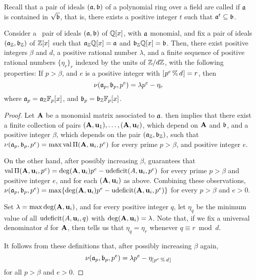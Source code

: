 \documentclass{amsart}
\begin{document}
Recall that a pair of ideals $(\mathfrak{a}, \mathfrak{b})$ of a polynomial ring over a field are called \emph{\compatible} if $\mathfrak{a}$ is contained in $\sqrt{\mathfrak{b}}$, that is, there exists a positive integer $t$ such that $\mathfrak{a}^t \subseteq \mathfrak{b}$.

\begin{corollary}
\label{cor: BMS result}
   Consider a \compatible\ pair of ideals $(\mathfrak{a}, \mathfrak{b})$ of $\mathbb{Q}[x]$, with $\mathfrak{a}$ monomial, and fix a pair of ideals $(\mathfrak{a}_{\mathbb{Z}}, \mathfrak{b}_{\mathbb{Z}})$ of $\mathbb{Z}[x]$ such that $\mathfrak{a}_{\mathbb{Z}} \mathbb{Q}[x] = \mathfrak{a}$ and $\mathfrak{b}_{\mathbb{Z}} \mathbb{Q}[x] = \mathfrak{b}$.    Then, there exist positive integers $\beta$ and $d$, a positive rational number $\lambda$, and a finite sequence of positive rational numbers $\{ \eta_r \}_r$ indexed by the units of $\mathbb{Z}/d\mathbb{Z}$, with the following properties:  If $p > \beta$, and $e$ is a positive integer with $[ \hspace{.01in} p^e \, \% \, d \hspace{.01in} ] = r$, then 
\[ \nu(\mathfrak{a}_p, \mathfrak{b}_p, p^e) = \lambda p^e - \eta_r \] where $\mathfrak{a}_p = \mathfrak{a}_{\mathbb{Z}} \mathbb{F}_p[x]$, and $\mathfrak{b}_p = \mathfrak{b}_{\mathbb{Z}} \mathbb{F}_p[x]$.
\end{corollary}

\begin{proof}  Let $\mathbf{A}$ be a monomial matrix associated to $\mathfrak{a}$.    then implies that there exist a finite collection of pairs $(\mathbf{A}, \mathbf{u}_1), \ldots, (\mathbf{A}, \mathbf{u}_{\ell})$, which depend on $\mathbf{A}$ and $\mathfrak{b}$, and a positive integer $\beta$, which depends on the pair $(\mathfrak{a}_{\mathbb{Z}}, \mathfrak{b}_{\mathbb{Z}})$,  such that $\nu(\mathfrak{a}_p, \mathfrak{b}_p, p^e) = \max \operatorname{val} \Pi(\mathbf{A}, \mathbf{u}_i, p^e)$  for every prime $p > \beta$, and positive integer $e$.  

On the other hand, after possibly increasing $\beta$,  guarantees that 
$\operatorname{val} \Pi(\mathbf{A}, \mathbf{u}_i, p^e) = \operatorname{deg}(\mathbf{A}, \mathbf{u}_i) p^e - \operatorname{udeficit}(A, \mathbf{u}_i, p^e)$  for every prime $p > \beta$ and positive integer $e$, and for each $(\mathbf{A}, \mathbf{u}_i)$ as above.   Combining these observations, 
$\nu(\mathfrak{a}_p, \mathfrak{b}_p, p^e) = \max  \{ \operatorname{deg}(\mathbf{A}, \mathbf{u}_i) p^e - \operatorname{udeficit}(\mathbf{A}, \mathbf{u}_i, p^e) \}$ for every $p > \beta$ and $e > 0$.  

Set $\lambda = \max \operatorname{deg}(\mathbf{A}, \mathbf{u}_i)$, and for every positive integer $q$, let $\eta_{q}$ be the minimum value of all $\operatorname{udeficit}(A, \mathbf{u}_i, q)$ with $ \operatorname{deg}(\mathbf{A}, \mathbf{u}_i) = \lambda$.  Note that, if we fix a universal denominator $d$ for $\mathbf{A}$, then  tells us that $\eta_q = \eta_r$ whenever $q \equiv r \bmod d$.  

It follows from these definitions that, after possibly increasing $\beta$ again, 
\[ \nu(\mathfrak{a}_p, \mathfrak{b}_p, p^e) = \lambda p^e - \eta_{[ \hspace{.01in} p^e \, \% \, d \hspace{.01in} ]} \] 
for all $p > \beta$ and $e > 0$.
\end{proof}
\end{document}

